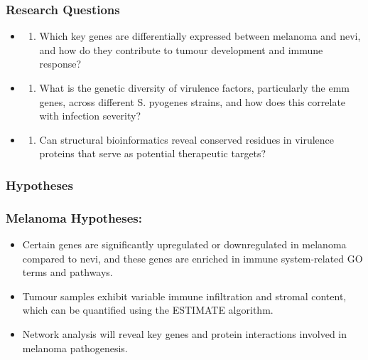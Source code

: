 \documentclass[
]{article}
\providecommand{\tightlist}{%
  \setlength{\itemsep}{0pt}\setlength{\parskip}{0pt}}
\begin{document}
\subsubsection{Research Questions}\label{research-questions}

\begin{itemize}
\tightlist
\item
  \begin{enumerate}
  \def\labelenumi{\arabic{enumi}.}
  \tightlist
  \item
    Which key genes are differentially expressed between melanoma and
    nevi, and how do they contribute to tumour development and immune
    response?
  \end{enumerate}
\item
  \begin{enumerate}
  \def\labelenumi{\arabic{enumi}.}
  \setcounter{enumi}{1}
  \tightlist
  \item
    What is the genetic diversity of virulence factors, particularly the
    emm genes, across different S. pyogenes strains, and how does this
    correlate with infection severity?
  \end{enumerate}
\item
  \begin{enumerate}
  \def\labelenumi{\arabic{enumi}.}
  \setcounter{enumi}{2}
  \tightlist
  \item
    Can structural bioinformatics reveal conserved residues in virulence
    proteins that serve as potential therapeutic targets?
  \end{enumerate}
\end{itemize}

\subsubsection{Hypotheses}\label{hypotheses}

\subsubsection{Melanoma Hypotheses:}\label{melanoma-hypotheses}

\begin{itemize}
\item
  Certain genes are significantly upregulated or downregulated in
  melanoma compared to nevi, and these genes are enriched in immune
  system-related GO terms and pathways.
\item
  Tumour samples exhibit variable immune infiltration and stromal
  content, which can be quantified using the ESTIMATE algorithm.
\item
  Network analysis will reveal key genes and protein interactions
  involved in melanoma pathogenesis.
\end{itemize}
\end{document}
